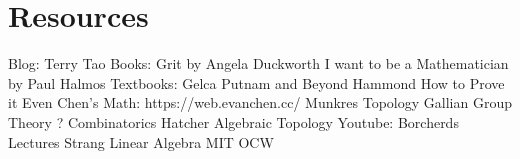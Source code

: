 \chapter{Resources}

Blog:
    Terry Tao
Books:
    Grit by Angela Duckworth
    I want to be a Mathematician by Paul Halmos
Textbooks:
    Gelca Putnam and Beyond
    Hammond How to Prove it
    Even Chen's Math: https://web.evanchen.cc/
    Munkres Topology
    Gallian Group Theory
    ? Combinatorics
    Hatcher Algebraic Topology
Youtube:
    Borcherds Lectures
    Strang Linear Algebra
MIT OCW
